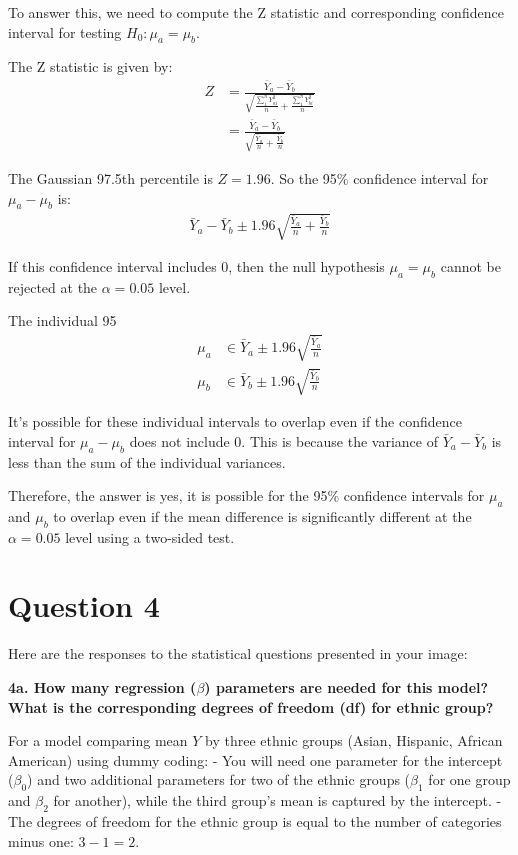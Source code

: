 \documentclass{article}
\begin{document}
To answer this, we need to compute the Z statistic and corresponding confidence interval for testing $H_0: \mu_a=\mu_b$.

The Z statistic is given by:
\begin{align*}
Z &= \frac{\bar{Y}_a - \bar{Y}_b}{\sqrt{\frac{\sum_1^n Y_{ai}^2}{n} + \frac{\sum_1^n Y_{bi}^2}{n}}} \\
&= \frac{\bar{Y}_a - \bar{Y}_b}{\sqrt{\frac{\bar{Y}_a}{n} + \frac{\bar{Y}_b}{n}}}
\end{align*}

The Gaussian 97.5th percentile is $Z=1.96$. So the 95\% confidence interval for $\mu_a-\mu_b$ is:
\begin{align*}
\bar{Y}_a - \bar{Y}_b \pm 1.96 \sqrt{\frac{\bar{Y}_a}{n} + \frac{\bar{Y}_b}{n}}
\end{align*}

If this confidence interval includes 0, then the null hypothesis $\mu_a=\mu_b$ cannot be rejected at the $\alpha=0.05$ level.

The individual 95%
\begin{align*}
\mu_a &\in \bar{Y}_a \pm 1.96 \sqrt{\frac{\bar{Y}_a}{n}} \\
\mu_b &\in \bar{Y}_b \pm 1.96 \sqrt{\frac{\bar{Y}_b}{n}}
\end{align*}

It's possible for these individual intervals to overlap even if the confidence interval for $\mu_a-\mu_b$ does not include 0. This is because the variance of $\bar{Y}_a - \bar{Y}_b$ is less than the sum of the individual variances.

Therefore, the answer is yes, it is possible for the 95\% confidence intervals for $\mu_a$ and $\mu_b$ to overlap even if the mean difference is significantly different at the $\alpha=0.05$ level using a two-sided test.

\section{Question 4}

Here are the responses to the statistical questions presented in your image:

\textbf{4a. How many regression ($\beta$) parameters are needed for this model? What is the corresponding degrees of freedom (df) for ethnic group?}

For a model comparing mean \( Y \) by three ethnic groups (Asian, Hispanic, African American) using dummy coding:
- You will need one parameter for the intercept (\( \beta_0 \)) and two additional parameters for two of the ethnic groups (\( \beta_1 \) for one group and \( \beta_2 \) for another), while the third group's mean is captured by the intercept.
- The degrees of freedom for the ethnic group is equal to the number of categories minus one: \( 3 - 1 = 2 \).
\end{document}
